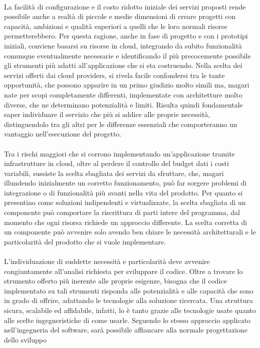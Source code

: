 \\
La facilità di configurazione e il costo ridotto iniziale dei servizi proposti rende possibile anche a realtà di piccole e medie dimensioni 
di creare progetti con capacità, ambizioni e qualità superiori a quelli che le loro normali risorse permetterebbero.
Per questa ragione, anche in fase di progetto e con i prototipi iniziali, conviene basarsi su risorse in cloud, 
integrando da subito funzionalità comunque eventualmente necessarie e 
identificando il più precocemente possibile gli strumenti più adatti all'applicazione che si sta costruendo.
Nella scelta dei servizi offerti dai cloud providers, si rivela facile confondersi tra le tante opportunità, 
che possono apparire in un primo giudizio molto simili ma, magari nate per scopi completamente differenti, 
implementate con architetture molto diverse, che ne determinano potenzialità e limiti.
Risulta quindi fondamentale saper individuare il servizio che più si addice alle proprie necessità, 
distinguendolo tra gli altri per le differenze essenziali che comporteranno un vantaggio nell'esecuzione del progetto.\\
\\
Tra i rischi maggiori che si corrono implementando un'applicazione tramite infrastrutture in cloud,
oltre al perdere il controllo del budget dati i costi variabili, sussiste la scelta sbagliata dei servizi da sfruttare, che, 
magari illundendo inizialmente un corretto funzionamento, può far sorgere problemi di integrazione o di funzionalità 
più avanti nella vita del prodotto.
Per quanto si presentino come soluzioni indipendenti e virtualizzate, 
la scelta sbagliata di un componente può comportare la riscrittura di parti intere del programma,
dal momento che ogni risorsa richiede un approccio differente.
La scelta corretta di un componente può avvenire solo avendo ben chiare le necessità architetturali e le particolarità del prodotto che si vuole implementare.\\
\\
L'individuazione di suddette necessità e particolarità deve avvenire congiuntamente all'analisi richiesta per sviluppare il codice.
Oltre a trovare lo strumento offerto più inerente alle proprie esigenze, 
bisogna che il codice implementato su tali strumenti risponda alle potenzialità e alle capacità che sono in grado di offrire, 
adattando le tecnologie alla soluzione ricercata.
Una struttura sicura, scalabile ed affidabile, infatti, lo è tanto grazie alle tecnologie usate quanto alle scelte ingegneristiche di come usarle.
Seguendo lo stesso approccio applicato nell'ingegneria del software, sarà possibile affiancare alla normale progettazione dello sviluppo 
